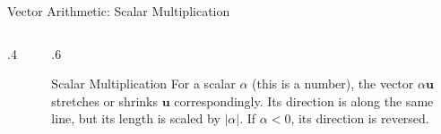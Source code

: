 \begin{frame}{Vector Arithmetic: Scalar Multiplication}

  
    \begin{columns}
        \begin{column}{.4\linewidth}
        \begin{figure}
            \centering
    \end{figure}
        
    \end{column}
    \begin{column}{.6\linewidth}
       \begin{block}{Scalar Multiplication}
          For a scalar $\alpha$ (this is a number), the vector $\alpha\mathbf{u}$ stretches or shrinks $\mathbf{u}$ correspondingly. Its direction is along the same line, but its length is scaled by $|\alpha|$. If $\alpha <0$, its direction is reversed.
        \end{block} 
    \end{column}
\end{columns}


\end{frame}


